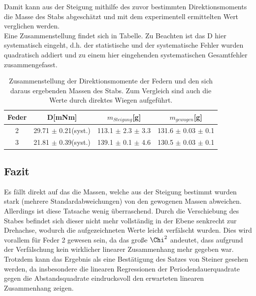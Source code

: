 \documentclass[12pt,a4paper]{article}
\begin{document}
Damit kann aus der Steigung mithilfe des zuvor bestimmten Direktionsmoments die Masse des Stabs abgeschätzt und mit dem experimentell ermittelten Wert verglichen werden.\\
Eine Zusammenstellung findet sich in Tabelle. Zu Beachten ist das D hier systematisch eingeht, d.h. der statistische und der systematische Fehler wurden quadratisch addiert und zu einem hier eingehenden systematischen Gesamtfehler zusammengefasst.

\begin{table}
\begin{center}
\begin{tabular}{|c|c|c|c|}
\hline
Feder & D[mNm] & $m_{Steigung}$[g] & $m_{gewogen}$[g] \\
\hline
2 & 29.71 $\pm$ 0.21(syst.) & 113.1 $\pm$ 2.3 $\pm$ 3.3 & 131.6 $\pm$ 0.03 $\pm$ 0.1\\
\hline
3 & 21.81 $\pm$ 0.39(syst.)& 139.1 $\pm$ 0.1 $\pm$ 4.6 & 130.5 $\pm$ 0.03 $\pm$ 0.1\\
\hline
\end{tabular}
\end{center}
\caption{Zusammenstellung der Direktionsmomente der Federn und den sich daraus ergebenden Massen des Stabs. Zum Vergleich sind auch die Werte durch direktes Wiegen aufgeführt.}
\label{tab:MassenReg}
\end{table}





\subsection{Fazit}
Es fällt direkt auf das die Massen, welche aus der Steigung bestimmt wurden stark (mehrere Standardabweichungen) von den gewogenen Massen abweichen.\\
Allerdings ist diese Tatsache wenig überraschend. Durch die Verschiebung des Stabes befindet sich dieser nicht mehr vollständig in der Ebene senkrecht zur Drehachse, wodurch die aufgezeichneten Werte leicht verfälscht wurden. Dies wird vorallem für Feder 2 gewesen sein, da das große $\Chi^2$ andeutet, dass aufgrund der Verfälschung kein wirklicher linearer Zusammenhang mehr gegeben war.\\
Trotzdem kann das Ergebnis als eine Bestätigung des Satzes von Steiner gesehen werden, da insbesondere die linearen Regressionen der Periodendauerquadrate gegen die Abstandsquadrate eindrucksvoll den erwarteten linearen Zusammenhang zeigen.
\end{document}
